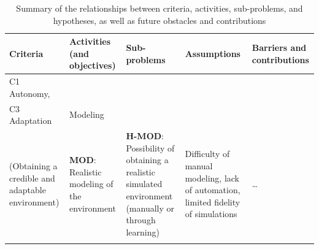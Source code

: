 \begin{table}[h!]
  \centering
  \caption{Summary of the relationships between criteria, activities, sub-problems, and hypotheses, as well as future obstacles and contributions}
  \label{tab:process-method}
  \renewcommand{\arraystretch}{1.2}
  \scriptsize
  \begin{tabularx}{\textwidth}{
      >{\raggedright\arraybackslash\hsize=0.20\hsize}X
      >{\raggedright\arraybackslash\hsize=0.20\hsize}X
      >{\raggedright\arraybackslash\hsize=0.25\hsize}X
      >{\raggedright\arraybackslash\hsize=0.26\hsize}X
      >{\raggedright\arraybackslash\hsize=0.09\hsize}X
    }
    \toprule
    \textbf{Criteria}                                                                                                        & \textbf{Activities (and objectives)} & \textbf{Sub-problems} & \textbf{Assumptions} & \textbf{Barriers and contributions} \\
    \midrule
    C1 Autonomy,                                                                                                                                                                                                                                         \\
    C3 Adaptation
                                                                                                                             &
    Modeling                                                                                                                                                                                                                                             \\
    (Obtaining a credible and adaptable environment)
                                                                                                                             &
    \textbf{MOD}: Realistic modeling of the environment
                                                                                                                             &
    \vspace{-1.05cm}\textbf{H-MOD}: Possibility of obtaining a realistic simulated environment (manually or through learning)
                                                                                                                             &
    \vspace{-1.05cm}Difficulty of manual modeling, lack of automation, limited fidelity of simulations                       & \dots
    \\
    \addlinespace[2pt]
    \hdashline

\end{tabularx}
\end{table}
